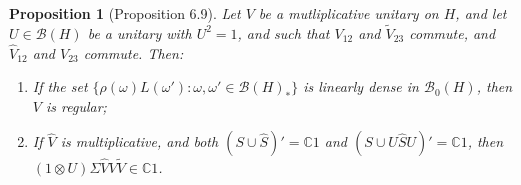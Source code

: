 \documentclass[a4paper,12pt]{article}
\theoremstyle{plain}
\newtheorem{proposition}{Proposition}[section]
\theoremstyle{definition}
\newcommand{\mc}{\mathcal}
\begin{document}
\begin{proposition}[Proposition 6.9]\label{prop:11}
Let $V$ be a mutliplicative unitary on $H$, and let $U\in\mc B(H)$ be
a unitary with $U^2=1$, and such that $V_{12}$ and $\tilde V_{23}$ commute,
and $\hat V_{12}$ and $V_{23}$ commute.   Then:
\begin{enumerate}
\item\label{prop:11.1} If the set $\{ \rho(\omega) L(\omega') : \omega,\omega'
\in\mc B(H)_*\}$ is linearly dense in $\mc B_0(H)$, then $V$ is regular;
\item\label{prop:11.2} If $\hat V$ is multiplicative, and both
$(S\cup \hat S)' = \mathbb C1$ and $(S\cup U\hat SU)'=\mathbb C1$, then
$(1\otimes U)\Sigma \hat V V \tilde V \in\mathbb C 1$.
\end{enumerate}
\end{proposition}
\end{document}
